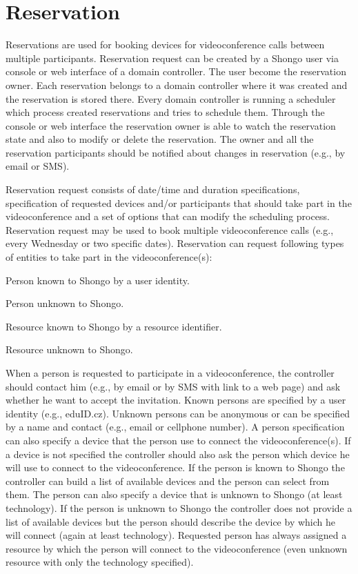 \chapter{Reservation}

Reservations are used for booking devices for videoconference calls between multiple participants. Reservation request can be created by a Shongo user via console or web interface of a domain controller. The user become the reservation owner. Each reservation belongs to a domain controller where it was created and the reservation is stored there. Every domain controller is running a scheduler which process created reservations and tries to schedule them. Through the console or web interface the reservation owner is able to watch the reservation state and also to modify or delete the reservation. The owner and all the reservation participants should be notified about changes in reservation (e.g., by email or SMS). 

Reservation request consists of date/time and duration specifications, specification of requested devices and/or participants that should take part in the videoconference and a set of options that can modify the scheduling process. Reservation request may be used to book multiple videoconference calls (e.g., every Wednesday or two specific dates). Reservation can request following types of entities to take part in the videoconference(s):
\begin{compactitem}
\item Person known to Shongo by a user identity.
\item Person unknown to Shongo.
\item Resource known to Shongo by a resource identifier.
\item Resource unknown to Shongo.
\end{compactitem}

When a person is requested to participate in a videoconference, the controller should contact him (e.g., by email or by SMS with link to a web page) and ask whether he want to accept the invitation. Known persons are specified by a user identity (e.g., eduID.cz). Unknown persons can be anonymous or can be specified by a name and contact (e.g., email or cellphone number). A person specification can also specify a device that the person use to connect the videoconference(s). If a device is not specified the controller should also ask the person which device he will use to connect to the videoconference. If the person is known to Shongo the controller can build a list of available devices and the person can select from them. The person can also specify a device that is unknown to Shongo (at least technology). If the person is unknown to Shongo the controller does not provide a list of available devices but the person should describe the device by which he will connect (again at least technology).  Requested person has always assigned a resource by which the person will connect to the videoconference (even unknown resource with only the technology specified).

